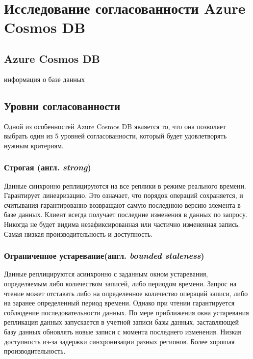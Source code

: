\documentclass[12pt,  openany]{book}
\begin{document}

\chapter{Исследование согласованности Azure Cosmos DB}
\section{Azure Cosmos DB}
информация о базе данных
\section{Уровни согласованности \cite{cosmosConsistencyLevels}}
Одной из особенностей Azure Cosmos DB является то, что она позволяет выбрать один из 5 уровней согласованности, который будет удовлетворять нужным критериям.
\subsection{Строгая (англ.  \textit{strong})}
Данные синхронно реплицируются на все реплики в режиме реального времени. Гарантирует линеаризацию. Это означает, что порядок операций сохраняется, и считывания гарантированно возвращают самую последнюю версию элемента в базе данных. Клиент всегда получает последние изменения в данных по запросу. Никогда не будет видима незафиксированная или частично измененная запись. Самая низкая производительность и доступность.
\subsection{Ограниченное устаревание(англ.  \textit{bounded staleness})}
Данные реплицируются асинхронно с заданным окном устаревания, определяемым либо количеством записей, либо периодом времени. Запрос на чтение может отставать либо на определенное количество операций записи, либо на заранее определенный период времени. Однако при чтении гарантируется соблюдение последовательности данных. По мере приближения окна устаревания репликация данных запускается в учетной записи базы данных, заставляющей базу данных обновлять новые записи с момента последнего изменения. Низкая доступность из-за задержки синхронизации разных регионов. Более хорошая производительность.
\end{document}
